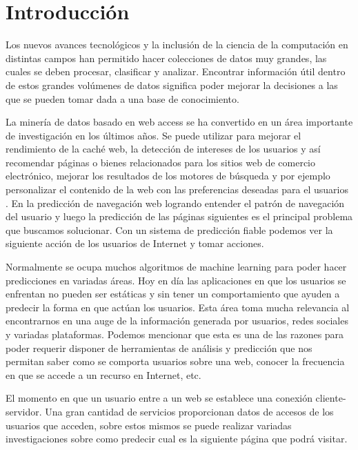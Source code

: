\chapter[Introducción]{Introducción}
\label{ch:intro}

{

Los nuevos avances tecnológicos  y la inclusión de la ciencia de la computación en distintas campos han permitido hacer colecciones de datos muy grandes, las cuales se deben procesar, clasificar y analizar. Encontrar información útil dentro de estos grandes volúmenes de datos significa poder mejorar la decisiones a las que se pueden tomar dada a una base de conocimiento.

La minería de datos basado en web access se ha convertido en un área importante de investigación en los últimos años. Se puede utilizar para mejorar el rendimiento de la caché web, la detección de intereses de los usuarios y así recomendar páginas o bienes relacionados para los sitios web de comercio electrónico, mejorar los resultados de los motores de búsqueda  y por ejemplo personalizar el contenido de la web con las preferencias deseadas para el usuarios . En la predicción de navegación web logrando entender el patrón de navegación del usuario y luego la predicción de las páginas siguientes es el principal problema que buscamos solucionar. Con un sistema de predicción fiable podemos ver la siguiente acción de los usuarios de Internet y tomar acciones.

Normalmente se ocupa muchos algoritmos de machine learning para poder hacer predicciones en variadas áreas.  Hoy en día las aplicaciones en que los usuarios se enfrentan no pueden ser estáticas y sin tener un comportamiento que ayuden a predecir la forma en que actúan los usuarios. Esta área toma mucha relevancia al encontrarnos en una auge de la información generada por usuarios, redes sociales y variadas plataformas. Podemos mencionar que esta es una de las razones para poder requerir disponer de herramientas de análisis y predicción que nos permitan saber como se comporta usuarios sobre una web, conocer la frecuencia en que se accede a un recurso en Internet, etc.

El momento en que un usuario entre a un web se establece una conexión cliente-servidor. Una gran cantidad de servicios proporcionan datos de accesos de los usuarios que acceden, sobre estos mismos se puede realizar variadas investigaciones sobre como predecir cual es la siguiente página que podrá visitar.

}
